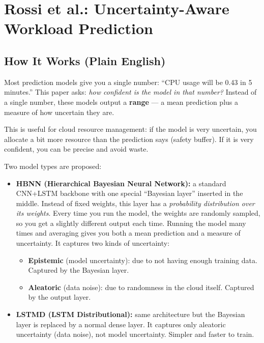 \documentclass[12pt,a4paper]{article}
\begin{document}
\section{\textcolor{rossicolor}{Rossi et al.}: Uncertainty-Aware Workload Prediction}
\label{sec:rossi}

\subsection{How It Works (Plain English)}

Most prediction models give you a single number: ``CPU usage will be 0.43 in
5 minutes.'' This paper asks: \emph{how confident is the model in that number?}
Instead of a single number, these models output a \textbf{range} --- a mean
prediction plus a measure of how uncertain they are.

This is useful for cloud resource management: if the model is very uncertain,
you allocate a bit more resource than the prediction says (safety buffer). If
it is very confident, you can be precise and avoid waste.

Two model types are proposed:

\begin{itemize}
  \item \textbf{HBNN (Hierarchical Bayesian Neural Network):} a standard
        CNN+LSTM backbone with one special ``Bayesian layer'' inserted in the
        middle. Instead of fixed weights, this layer has a \emph{probability
        distribution over its weights}. Every time you run the model, the
        weights are randomly sampled, so you get a slightly different output
        each time. Running the model many times and averaging gives you both
        a mean prediction and a measure of uncertainty.
        It captures two kinds of uncertainty:
        \begin{itemize}
          \item \textbf{Epistemic} (model uncertainty): due to not having
                enough training data. Captured by the Bayesian layer.
          \item \textbf{Aleatoric} (data noise): due to randomness in the
                cloud itself. Captured by the output layer.
        \end{itemize}
  \item \textbf{LSTMD (LSTM Distributional):} same architecture but the
        Bayesian layer is replaced by a normal dense layer. It captures
        only aleatoric uncertainty (data noise), not model uncertainty.
        Simpler and faster to train.
\end{itemize}
\end{document}
